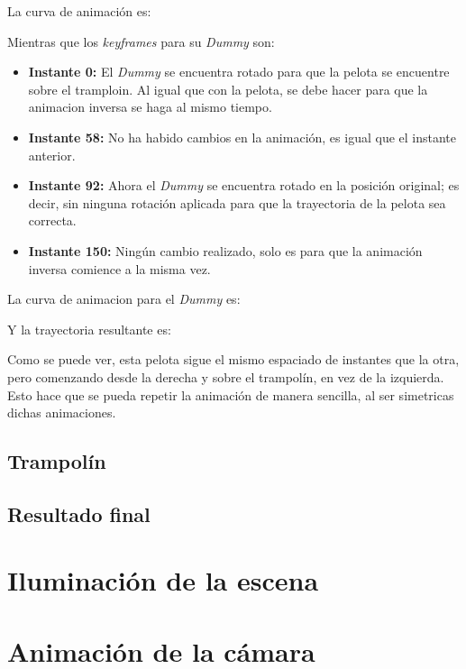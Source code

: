 \documentclass{article}
\begin{document}
La curva de animación es:


Mientras que los \textit{keyframes} para su \textit{Dummy} son:

\begin{itemize}
    \item \textbf{Instante 0: }El \textit{Dummy} se encuentra rotado para que la pelota se encuentre sobre el tramploin. Al igual que con la pelota, se debe hacer para que la animacion inversa se haga al mismo tiempo.
    \item \textbf{Instante 58: }No ha habido cambios en la animación, es igual que el instante anterior.
    \item \textbf{Instante 92: }Ahora el \textit{Dummy} se encuentra rotado en la posición original; es decir, sin ninguna rotación aplicada para que la trayectoria de la pelota sea correcta.
    \item \textbf{Instante 150: }Ningún cambio realizado, solo es para que la animación inversa comience a la misma vez.
\end{itemize}

La curva de animacion para el \textit{Dummy} es:



Y la trayectoria resultante es:



Como se puede ver, esta pelota sigue el mismo espaciado de instantes que la otra, pero comenzando desde la derecha y sobre el trampolín, en vez de la izquierda. Esto hace que se pueda repetir la animación de manera sencilla, al ser simetricas dichas animaciones.
\subsection{Trampolín}


\subsection{Resultado final}

\section{Iluminación de la escena}

\section{Animación de la cámara}
\end{document}
